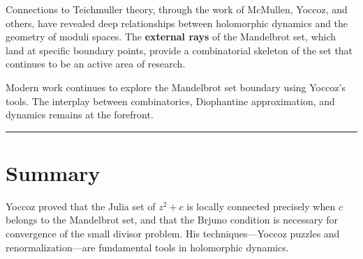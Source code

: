 Connections to Teichmuller theory, through the work of McMullen,
Yoccoz, and others, have revealed deep relationships between
holomorphic dynamics and the geometry of moduli spaces.  The
\textbf{external rays} of the Mandelbrot set, which land at
specific boundary points, provide a combinatorial skeleton of the
set that continues to be an active area of research.

Modern work continues to explore the Mandelbrot set boundary using
Yoccoz's tools.  The interplay between combinatorics, Diophantine
approximation, and dynamics remains at the forefront.

\begin{center}\rule{0.5\linewidth}{0.5pt}\end{center}

\section*{Summary}

Yoccoz proved that the Julia set of $z^2+c$ is locally connected
precisely when $c$ belongs to the Mandelbrot set, and that the
Brjuno condition is necessary for convergence of the small divisor
problem.  His techniques---Yoccoz puzzles and
renormalization---are fundamental tools in holomorphic dynamics.

